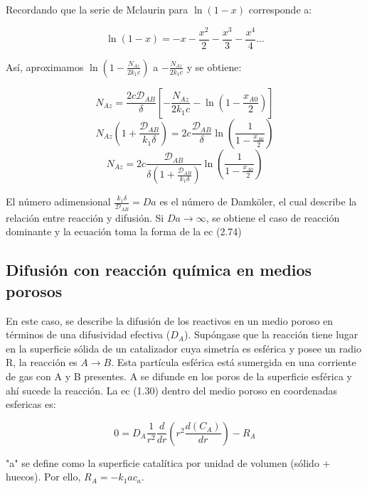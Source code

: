 Recordando que la serie de Mclaurin para $\ln (1-x)$ corresponde a:

\begin{equation*}
    \ln (1-x)=-x-\frac{x^2}{2}-\frac{x^3}{3}-\frac{x^4}{4}...
\end{equation*}

Así, aproximamos $\ln (1-\frac{N_{Az}}{2k_1c})$ a $-\frac{N_{Az}}{2k_1c}$
y se obtiene:

\begin{equation*}
   N_{Az}=\frac{2c\mathscr{D}_{AB}}{\delta}[-\frac{N_{Az}}{2k_1c}-\ln (1-\frac{x_{A0}}{2})] 
\end{equation*}
\begin{equation*}
   N_{Az}(1+\frac{\mathscr{D}_{AB}}{k_1\delta})=2c\frac{\mathscr{D}_{AB}}{\delta}\ln (\frac{1}{1-\frac{x_{A0}}{2}}  )  
\end{equation*}
\begin{equation}
   N_{Az}=2c\frac{\mathscr{D}_{AB}}{\delta(1+\frac{\mathscr{D}_{AB}}{k_1\delta})}\ln (\frac{1}{1-\frac{x_{A0}}{2}}  )  
\end{equation}

El número adimensional $\frac{k_1\delta}{\mathscr{D}_{AB}}=Da$ es el número de Damköler, el cual describe la relación entre reacción y difusión. Si $Da\rightarrow\infty$, se obtiene el caso de reacción dominante y la ecuación toma la forma de la ec (2.74)

\subsection{Difusión con reacción química en medios porosos}

En este caso, se describe la difusión de los reactivos en un medio poroso en términos de una difusividad efectiva ($D_A$). Supóngase que la reacción tiene lugar en la superficie sólida de un catalizador cuya simetría es esférica y posee un radio R, la reacción es $A\rightarrow B$. Esta partícula esférica está sumergida en una corriente de gas con A y B presentes. A se difunde en los poros de la superficie esférica y ahí sucede la reacción. La ec (1.30) dentro del medio poroso en coordenadas esfericas es:

\begin{equation}
    0=D_A\frac{1}{r^2}\frac{d}{dr}(r^2\frac{d(C_A)}{dr})-R_A
\end{equation}

"a" se define como la superficie catalítica por unidad de volumen (sólido + huecos). Por ello, $R_A=-k_1ac_a$.

